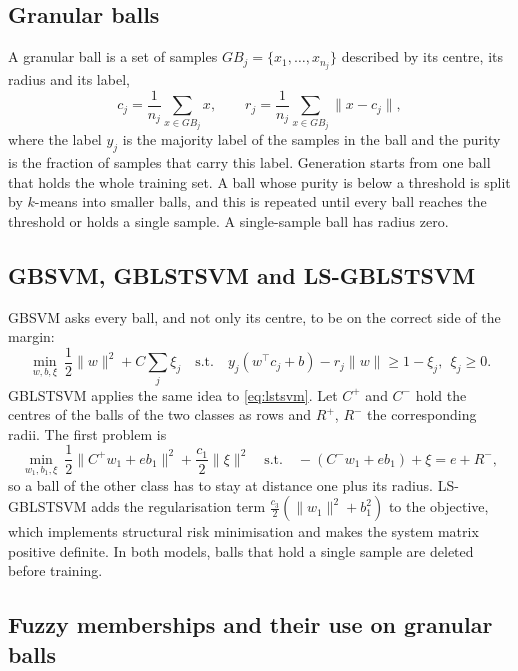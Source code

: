\documentclass[preprint,12pt]{elsarticle}
\begin{document}
\subsection{Granular balls}

A granular ball \cite{xia2019} is a set of samples $GB_j=\{x_1,\dots,x_{n_j}\}$ described by its centre, its radius and its label,
\begin{equation}
c_j=\frac{1}{n_j}\sum_{x\in GB_j}x,\qquad r_j=\frac{1}{n_j}\sum_{x\in GB_j}\lVert x-c_j\rVert ,
\end{equation}
where the label $y_j$ is the majority label of the samples in the ball and the purity is the fraction of samples that carry this label. Generation starts from one ball that holds the whole training set. A ball whose purity is below a threshold is split by $k$-means into smaller balls, and this is repeated until every ball reaches the threshold or holds a single sample. A single-sample ball has radius zero.

\subsection{GBSVM, GBLSTSVM and LS-GBLSTSVM}

GBSVM \cite{xia2022gbsvm} asks every ball, and not only its centre, to be on the correct side of the margin:
\begin{equation}
\min_{w,b,\xi}\ \frac{1}{2}\lVert w\rVert^{2}+C\sum_{j}\xi_j\quad\text{s.t.}\quad y_j(w^{\top}c_j+b)-r_j\lVert w\rVert\ge 1-\xi_j,\ \ \xi_j\ge 0 .
\label{eq:gbsvm}
\end{equation}
GBLSTSVM \cite{tanveer2024gblstsvm} applies the same idea to \eqref{eq:lstsvm}. Let $C^{+}$ and $C^{-}$ hold the centres of the balls of the two classes as rows and $R^{+}$, $R^{-}$ the corresponding radii. The first problem is
\begin{equation}
\min_{w_1,b_1,\xi}\ \frac{1}{2}\lVert C^{+}w_1+eb_1\rVert^{2}+\frac{c_1}{2}\lVert\xi\rVert^{2}
\quad\text{s.t.}\quad -(C^{-}w_1+eb_1)+\xi=e+R^{-} ,
\end{equation}
so a ball of the other class has to stay at distance one plus its radius. LS-GBLSTSVM adds the regularisation term $\frac{c_3}{2}(\lVert w_1\rVert^{2}+b_1^{2})$ to the objective, which implements structural risk minimisation and makes the system matrix positive definite. In both models, balls that hold a single sample are deleted before training.

\subsection{Fuzzy memberships and their use on granular balls}
\end{document}
